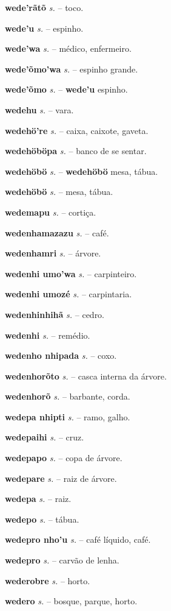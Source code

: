 \textbf{wede'rãtõ} \textit{s.} -- toco.

\textbf{wede'u} \textit{s.} -- espinho.

\textbf{wede'wa} \textit{s.} -- médico, enfermeiro.

\textbf{wede'õmo'wa} \textit{s.} -- espinho grande.

\textbf{wede'õmo} \textit{s.} -- \textbf{wede'u} espinho.

\textbf{wedehu} \textit{s.} -- vara.

\textbf{wedehö're} \textit{s.} -- caixa, caixote, gaveta.

\textbf{wedehöböpa} \textit{s.} -- banco de se sentar.

\textbf{wedehöbö} \textit{s.} -- \textbf{wedehöbö} mesa, tábua.

\textbf{wedehöbö} \textit{s.} -- mesa, tábua.

\textbf{wedemapu} \textit{s.} -- cortiça.

\textbf{wedenhamazazu} \textit{s.} -- café.

\textbf{wedenhamri} \textit{s.} -- árvore.

\textbf{wedenhi umo'wa} \textit{s.} -- carpinteiro.

\textbf{wedenhi umozé} \textit{s.} -- carpintaria.

\textbf{wedenhinhihã} \textit{s.} -- cedro.

\textbf{wedenhi} \textit{s.} -- remédio.

\textbf{wedenho nhipada} \textit{s.} -- coxo.

\textbf{wedenhorõto} \textit{s.} -- casca interna da árvore.

\textbf{wedenhorõ} \textit{s.} -- barbante, corda.

\textbf{wedepa nhipti} \textit{s.} -- ramo, galho.

\textbf{wedepaihi} \textit{s.} -- cruz.

\textbf{wedepapo} \textit{s.} -- copa de árvore.

\textbf{wedepare} \textit{s.} -- raiz de árvore.

\textbf{wedepa} \textit{s.} -- raiz.

\textbf{wedepo} \textit{s.} -- tábua.

\textbf{wedepro nho'u} \textit{s.} -- café líquido, café.

\textbf{wedepro} \textit{s.} -- carvão de lenha.

\textbf{wederobre} \textit{s.} -- horto.

\textbf{wedero} \textit{s.} -- bosque, parque, horto.

